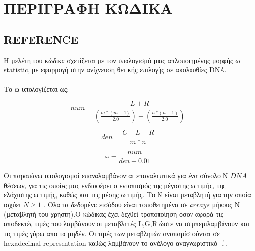 \documentclass[11pt]{article}
\begin{document}
\vspace{15mm}

\section{ΠΕΡΙΓΡΑΦΗ ΚΩΔΙΚΑ}
\vspace{5mm}
\subsection{ REFERENCE}
 Η μελέτη του κώδικα σχετίζεται με τον υπολογισμό μιας απλοποιημένης μορφής ω 
 statistic, με εφαρμογή στην ανίχνευση θετικής επιλογής σε ακολουθίες  
DNA. \\\\Το ω υπολογίζεται ως:

\begin{center}
$$num = \frac{L+R}{\left(\frac{m*\left(m-1\right)}{2.0}\right)+\left(\frac{n*\left(n-1\right)}{2.0}\right)}$$

$$den = \frac{C-L-R}{m*n}$$

$$\omega = \frac{num}{den+0.01}$$
\end{center}
{}
Οι παραπάνω υπολογισμοί επαναλαμβάνονται επαναληπτικά για ένα σύνολο N $DNA$ θέσεων, για
τις οποίες μας ενδιαφέρει ο εντοπισμός της μέγιστης ω τιμής, της ελάχιστης ω τιμής, καθώς και
της μέσης ω τιμής. Το Ν είναι μεταβλητή για την οποία ισχύει $N \geq 1$ . Όλα τα δεδομένα εισόδου
είναι τοποθετημένα σε $arrays$ μήκους Ν (μεταβλητή του χρήστη).\hfill \break Ο κώδικας έχει δεχθεί τροποποίηση όσον αφορά τις αποδεκτές τιμές που λαμβάνουν οι μεταβλητές  L,G,R
 ώστε να συμπεριλαμβάνουν και τις τιμές γύρω απο το μηδέν.  Οι τιμές των μεταβλητών 
αναπαρίστούνται σε  hexadecimal representation   καθώς λαμβάνουν το ανάλογο αναγνωριστικό  -f .
\end{document}
